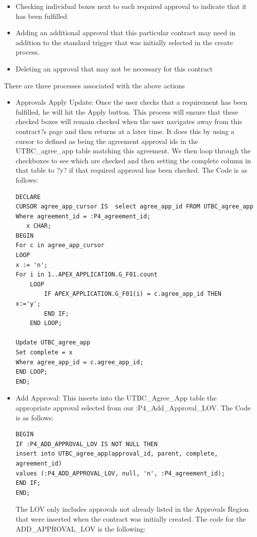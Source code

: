 \documentclass{report}
\begin{document}
\begin{itemize}
\item Checking individual boxes next to each required approval to indicate that it has been fulfilled
\item Adding an additional approval that this particular contract may need in addition to the standard trigger that was initially selected in the create process. 
\item Deleting an approval that may not be necessary for this contract
\end{itemize}

There are three processes associated with the above actions 
\begin{itemize}
\item Approvals Apply Update:  Once the user checks that a requirement has been fulfilled, he will hit the Apply button.  This process will ensure that these checked boxes will remain checked when the user navigates away from this contract?s page and then returns at a later time.  It does this by using a cursor to defined as being the agreement approval ids in the UTBC\_agree\_app table matching this agreement.  We then loop through the checkboxes to see which are checked and then setting the complete column in that table to ?y? if that required approval has been checked.  The Code is as follows: 
\begin{lstlisting}
DECLARE
CURSOR agree_app_cursor IS  select agree_app_id FROM UTBC_agree_app 
Where agreement_id = :P4_agreement_id;
   x CHAR; 
BEGIN
For c in agree_app_cursor
LOOP
x := 'n'; 
For i in 1..APEX_APPLICATION.G_F01.count
  	LOOP
		IF APEX_APPLICATION.G_F01(i) = c.agree_app_id THEN
x:='y';
   		END IF;   
  	END LOOP;  

Update UTBC_agree_app
Set complete = x
Where agree_app_id = c.agree_app_id; 
END LOOP;
END;
\end{lstlisting}
\item Add Approval:  This inserts into the UTBC\_Agree\_App table the appropriate approval selected from our :P4\_Add\_Approval\_LOV. The Code is as follows: 

\begin{lstlisting}
BEGIN
IF :P4_ADD_APPROVAL_LOV IS NOT NULL THEN
insert into UTBC_agree_app(approval_id, parent, complete, agreement_id) 
values (:P4_ADD_APPROVAL_LOV, null, 'n', :P4_agreement_id);
END IF;
END;
\end{lstlisting}

The LOV only includes approvals not already listed in the Approvals Region that were inserted when the contract was initially created.  The code for the ADD\_APPROVAL\_LOV is the following: 


\end{itemize}
\end{document}
